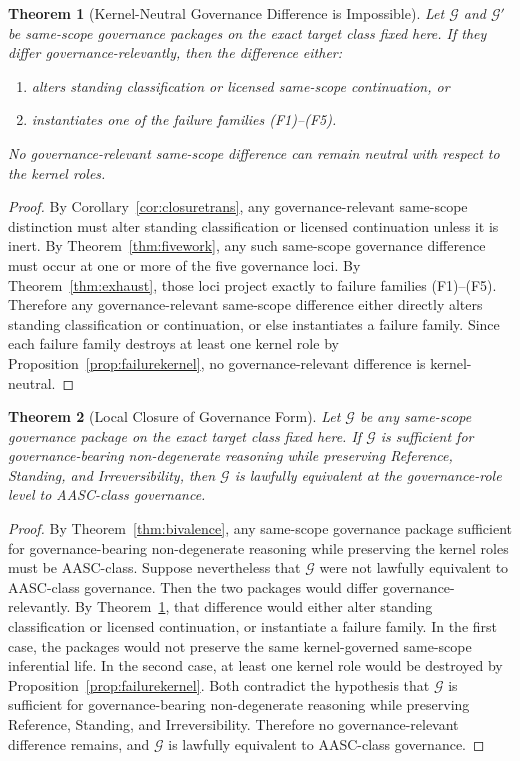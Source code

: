 \documentclass[11pt]{article}
\newtheorem{theorem}{Theorem}[section]
\begin{document}
\begin{theorem}[Kernel-Neutral Governance Difference is Impossible]
\label{thm:nokernelneutral}
Let $\mathcal{G}$ and $\mathcal{G}'$ be same-scope governance packages on the exact target class fixed here. If they differ governance-relevantly, then the difference either:
\begin{enumerate}
\item[(i)] alters standing classification or licensed same-scope continuation, or
\item[(ii)] instantiates one of the failure families \textup{(F1)}--\textup{(F5)}.
\end{enumerate}
No governance-relevant same-scope difference can remain neutral with respect to the kernel roles.
\end{theorem}

\begin{proof}
By Corollary~\ref{cor:closuretrans}, any governance-relevant same-scope distinction must alter standing classification or licensed continuation unless it is inert. By Theorem~\ref{thm:fivework}, any such same-scope governance difference must occur at one or more of the five governance loci. By Theorem~\ref{thm:exhaust}, those loci project exactly to failure families \textup{(F1)}--\textup{(F5)}. Therefore any governance-relevant same-scope difference either directly alters standing classification or continuation, or else instantiates a failure family. Since each failure family destroys at least one kernel role by Proposition~\ref{prop:failurekernel}, no governance-relevant difference is kernel-neutral.
\end{proof}

\begin{theorem}[Local Closure of Governance Form]
\label{thm:localclosure}
Let $\mathcal{G}$ be any same-scope governance package on the exact target class fixed here. If $\mathcal{G}$ is sufficient for governance-bearing non-degenerate reasoning while preserving Reference, Standing, and Irreversibility, then $\mathcal{G}$ is lawfully equivalent at the governance-role level to AASC-class governance.
\end{theorem}

\begin{proof}
By Theorem~\ref{thm:bivalence}, any same-scope governance package sufficient for governance-bearing non-degenerate reasoning while preserving the kernel roles must be AASC-class. Suppose nevertheless that $\mathcal{G}$ were not lawfully equivalent to AASC-class governance. Then the two packages would differ governance-relevantly. By Theorem~\ref{thm:nokernelneutral}, that difference would either alter standing classification or licensed continuation, or instantiate a failure family. In the first case, the packages would not preserve the same kernel-governed same-scope inferential life. In the second case, at least one kernel role would be destroyed by Proposition~\ref{prop:failurekernel}. Both contradict the hypothesis that $\mathcal{G}$ is sufficient for governance-bearing non-degenerate reasoning while preserving Reference, Standing, and Irreversibility. Therefore no governance-relevant difference remains, and $\mathcal{G}$ is lawfully equivalent to AASC-class governance.
\end{proof}
\end{document}
